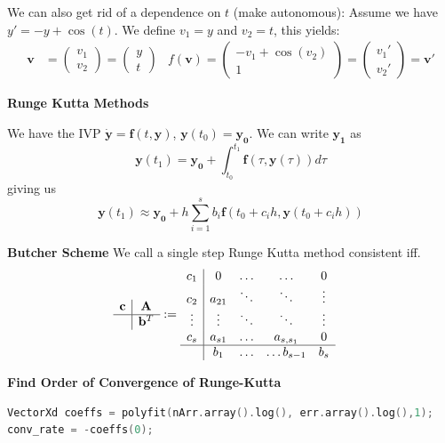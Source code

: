 \documentclass{sciposter}
\renewcommand{\vec}[1]{\mathbf{#1}}
\newcommand{\psection}[1]{\par \textbf{\large#1}}
\begin{document}
\begin{multicols}{2}
We can also get rid of a dependence on $t$ (make autonomous): Assume we have $y' = -y + \cos(t)$. We define $v_1 = y$ and $v_2 = t$, this yields:
\begin{align*}
	\vec{v} &= \begin{pmatrix}
		v_1 \\ v_2
	\end{pmatrix} = \begin{pmatrix}
		y \\ t
	\end{pmatrix} & f(\vec{v}) = \begin{pmatrix}
		-v_1 + \cos(v_2) \\ 1
	\end{pmatrix} = \begin{pmatrix}
		v_1 '\\ v_2 '
	\end{pmatrix} = \vec{v}'
\end{align*}



\psection{Runge Kutta Methods}

We have the IVP  $\dot{\vec{y}} = \vec{f}(t,\vec{y})$, $\vec{y}(t_0) = \vec{y_0}$. We can write $\vec{y_1}$ as $$\vec{y}(t_1) = \vec{y_0} + \int_{t_0}^{t_1} \vec{f}(\tau, \vec{y}(\tau)) d\tau $$
giving us
$$
\vec{y}(t_1) \approx \vec{y_0} + h\sum_{i=1}^{s} b_i \vec{f}(t_0 + c_i h , \vec{y}(t_0 + c_i h))
$$

\psection{Butcher Scheme}
We call a single step Runge Kutta method consistent iff. 
\begin{align*}
	\begin{array}
	{c|c}
	\vec{c} &  \vec{A} \\
	\hline
	& \vec{b}^T
	\end{array} &:= 
	\begin{array}{c|cccc}
	c_1 &  0 & \ldots & \ldots & 0  \\
	c_2 &  a_{21} & \ddots &\ddots & \vdots\\
	\vdots & \vdots& \ddots & \ddots & \vdots \\
	c_s & a_{s1} & \ldots & a_{s,s_1} & 0\\
	\hline
	& b_1 &\ldots & \ldots b_{s-1} & b_s
	\end{array} 
\end{align*}

\psection{Find Order of Convergence of Runge-Kutta}
\begin{lstlisting}[language=c++]
VectorXd coeffs = polyfit(nArr.array().log(), err.array().log(),1); 
conv_rate = -coeffs(0);
\end{lstlisting}




\end{multicols}
\end{document}
